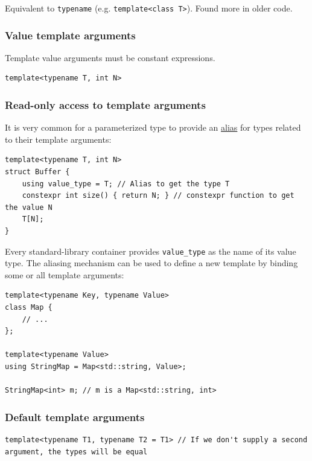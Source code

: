 \documentclass[table, xcdraw]{article}%
\begin{document}
Equivalent to \texttt{typename} (e.g. \texttt{template<class T>}). Found more in older code.

\subsubsection{Value template arguments}

Template value arguments must be constant expressions.

\begin{verbatim}
template<typename T, int N>
\end{verbatim}

\subsubsection{Read-only access to template arguments} \label{readonlyaccesstotemplatearguments}

It is very common for a parameterized type to provide an \hyperref[alias]{alias} for types related to their template arguments:

\begin{verbatim}
template<typename T, int N>
struct Buffer {
    using value_type = T; // Alias to get the type T
    constexpr int size() { return N; } // constexpr function to get the value N
    T[N];
}
\end{verbatim}

Every standard-library container provides \texttt{value_type} as the name of its value type. The aliasing mechanism can be used to define a new template by binding some or all template arguments:

\begin{verbatim}
template<typename Key, typename Value>
class Map {
    // ...
};

template<typename Value>
using StringMap = Map<std::string, Value>;

StringMap<int> m; // m is a Map<std::string, int>
\end{verbatim}

\subsubsection{Default template arguments} \label{default_template_arguments}

\begin{verbatim}
template<typename T1, typename T2 = T1> // If we don't supply a second argument, the types will be equal
\end{verbatim}
\end{document}
